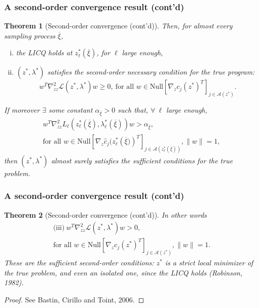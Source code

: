 \documentclass[aspectratio=169]{beamer}
\newtheorem{theo}{Theorem}
\begin{document}
\begin{frame}
\frametitle{A second-order convergence result (cont'd)}
	
\begin{small}
\begin{theo}[Second-order convergence (cont'd)]
Then, for almost every sampling process $\overline{\xi}$,
\begin{enumerate}[(i)]
\item
the LICQ holds at $z^*_{\ell}( \overline{\xi} )$, for $\ell$ large enough,
\item
$( z^*, \lambda^* )$ satisfies the second-order necessary condition for the true program:
\[
w^T \nabla_{zz}^2 \mathcal{L} ( z^*, \lambda^* ) w \geq 0,\
\text{for all }w \in \text{Null}\left[\nabla_z c_j (z^* )^T \right]_{j
  \in \mathcal{A} ( z^*)}.
\]
\end{enumerate}
\noindent
If moreover $\exists$ some constant $\alpha_{\overline{\xi}} > 0$ such that, $\forall\ \ell$ large enough,
\begin{multline*}
w^T \nabla_{zz}^2 L_{\ell} \left(z^*_{\ell}(\overline{\xi}),
\lambda^*_{\ell}(\overline{\xi}) \right) w > \alpha_{\overline{\xi}},
\\\text{for all }w \in
\text{Null}\left[\nabla_z \hat{c}_j(z^*_{\ell} \left( \overline{\xi})
  \right)^T \right]_{j \in \mathcal{A} (z^*_{\ell}(\overline{\xi})) },
 \|w\|=1,
\end{multline*}
then $( z^*, \lambda^* )$ almost surely satisfies the sufficient conditions for the true problem.
\end{theo}
\end{small}

\end{frame}

\begin{frame}
\frametitle{A second-order convergence result (cont'd)}

\begin{theo}[Second-order convergence (cont'd)]
In other words
\begin{multline*}
\text{(iii)}\ w^T \nabla_{zz}^2 \mathcal{L} ( z^*, \lambda^* )
w > 0,\\ \text{for all }w \in
\text{Null} \left[ \nabla_z c_j ( z^* )^T
  \right]_{j \in \mathcal{A} ( z^* )},
\|w\|=1.
\end{multline*}
These are the sufficient second-order conditions: $z^*$ is a strict local minimizer of the true problem, and even an isolated one, since the LICQ holds (Robinson, 1982).
\end{theo}

\begin{proof}
See Bastin, Cirillo and Toint, 2006.
\end{proof}

\end{frame}
\end{document}
